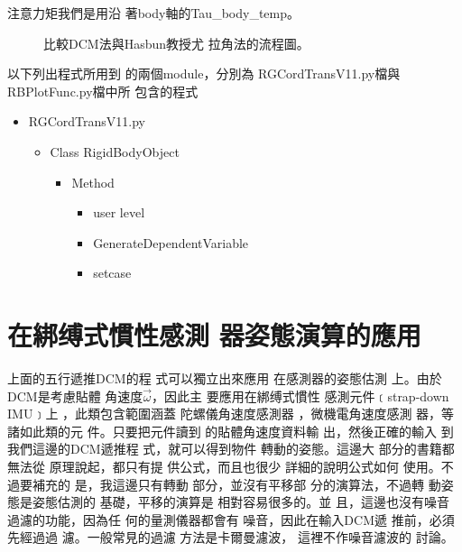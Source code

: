 \documentclass[12pt,twoside]{article}
\begin{document}
注意力矩我們是用沿%
著body軸的Tau\_body\_temp。

\begin{figure}[th]
\caption{比較DCM法與Hasbun教授尤%
拉角法的流程圖。}
\label{compareDCM-Hasbun}
\begin{center}

\end{center}
\end{figure}

以下列出程式所用到%
的兩個module，分別為%
RGCordTransV11.py檔與RBPlotFunc.py檔中所%
包含的程式

\begin{itemize}
\item RGCordTransV11.py

\begin{itemize}
\item Class RigidBodyObject

\begin{itemize}
\item Method

\begin{itemize}
\item 
user level

\item GenerateDependentVariable

\item setcase
\end{itemize}
\end{itemize}
\end{itemize}
\end{itemize}

\part{在綁缚式慣性感測%
器姿態演算的應用}

上面的五行遞推DCM的程%
式可以獨立出來應用%
在感測器的姿態估測%
上。由於DCM是考慮貼體%
角速度$\vec{\omega}$，因此主%
要應用在綁缚式慣性%
感測元件﹝strap-down IMU﹞上%
，此類包含範圍涵蓋%
陀螺儀角速度感測器%
，微機電角速度感測%
器，等諸如此類的元%
件。只要把元件讀到%
的貼體角速度資料輸%
出，然後正確的輸入%
到我們這邊的DCM遞推程%
式，就可以得到物件%
轉動的姿態。這邊大%
部分的書籍都無法從%
原理說起，都只有提%
供公式，而且也很少%
詳細的說明公式如何%
使用。不過要補充的%
是，我這邊只有轉動%
部分，並沒有平移部%
分的演算法，不過轉%
動姿態是姿態估測的%
基礎，平移的演算是%
相對容易很多的。並%
且，這邊也沒有噪音%
過濾的功能，因為任%
何的量測儀器都會有%
噪音，因此在輸入DCM遞%
推前，必須先經過過%
濾。一般常見的過濾%
方法是卡爾曼濾波，%
這裡不作噪音濾波的%
討論。
\end{document}
